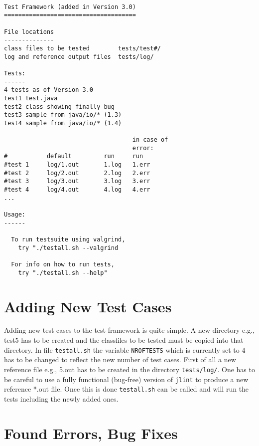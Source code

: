 \documentclass[11pt,twoside,a4paper,draft]{article}
\begin{document}
\begin{verbatim}

Test Framework (added in Version 3.0)
=====================================

File locations
--------------
class files to be tested        tests/test#/
log and reference output files  tests/log/

Tests:
------
4 tests as of Version 3.0
test1 test.java
test2 class showing finally bug
test3 sample from java/io/* (1.3)
test4 sample from java/io/* (1.4)

                                    in case of
                                    error:
#           default         run     run
#test 1     log/1.out       1.log   1.err
#test 2     log/2.out       2.log   2.err
#test 3     log/3.out       3.log   3.err
#test 4     log/4.out       4.log   4.err
...

Usage:
------

  To run testsuite using valgrind, 
	try "./testall.sh --valgrind

  For info on how to run tests, 
	try "./testall.sh --help"

\end{verbatim}



\section {Adding New Test Cases}

Adding new test cases to the test framework is quite simple. A new directory
 e.g., test5 has to be created and the classfiles to be tested must be copied
 into that directory. In file \texttt{testall.sh} the variable
 \texttt{NROFTESTS} which is currently set to 4 has to be changed to reflect 
the new number of test cases. First of all a new reference file e.g., 5.out
 has to be created in the directory \texttt{tests/log/}. One has to be careful
 to use a fully functional (bug-free) version of \texttt{jlint} to produce a
 new reference *.out file. Once this is done \texttt{testall.sh} can be called
 and will run the tests including the newly added ones.

\section {Found Errors, Bug Fixes}
\end{document}
